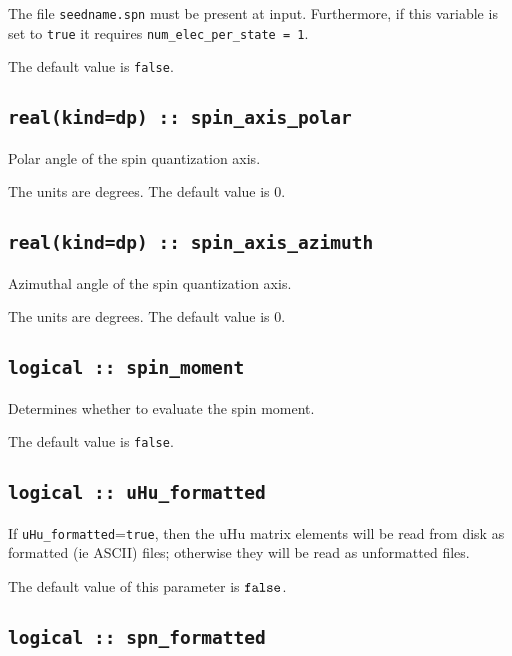 The file {\tt seedname.spn} must be present at input. Furthermore, if
this variable is set to \verb#true# it
requires {\tt num\_elec\_per\_state = 1}.

The default value is \verb#false#.

  \subsection{\tt real(kind=dp) :: spin\_axis\_polar}
Polar angle of the spin quantization axis.

The units are degrees. The default value is 0.

\subsection{\tt real(kind=dp) :: spin\_axis\_azimuth}
Azimuthal angle of the spin quantization axis. 

The units are degrees. The default value is 0.

\subsection[spin\_moment]{\tt logical :: spin\_moment}
Determines whether to evaluate the spin moment.

The default value is \verb#false#.

\subsection[uHu\_formatted]{\tt logical :: uHu\_formatted}

If \verb#uHu_formatted#=\verb#true#, then the uHu matrix elements will be
read from disk as formatted (ie ASCII) files; otherwise they will be
read as unformatted files.

The default value of this parameter is $\verb#false#$.




\subsection[spn\_formatted]{\tt logical :: spn\_formatted}


